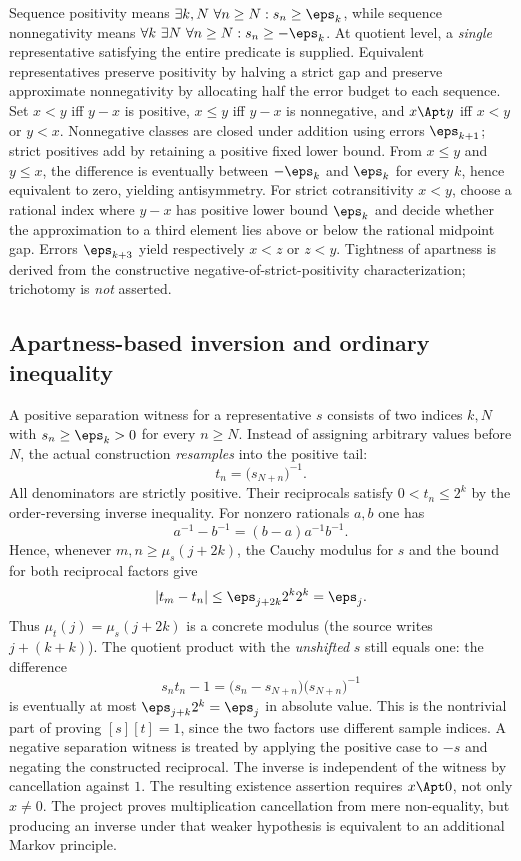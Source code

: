 Sequence positivity means $\exists k,N\ \forall n\ge N: s_n\ge\eps_k$, while sequence nonnegativity means $\forall k\ \exists N\ \forall n\ge N:s_n\ge-\eps_k$. At quotient level, a \emph{single} representative satisfying the entire predicate is supplied. Equivalent representatives preserve positivity by halving a strict gap and preserve approximate nonnegativity by allocating half the error budget to each sequence. Set $x<y$ iff $y-x$ is positive, $x\le y$ iff $y-x$ is nonnegative, and $x\Apt y$ iff $x<y$ or $y<x$. Nonnegative classes are closed under addition using errors $\eps_{k+1}$; strict positives add by retaining a positive fixed lower bound. From $x\le y$ and $y\le x$, the difference is eventually between $-\eps_k$ and $\eps_k$ for every $k$, hence equivalent to zero, yielding antisymmetry. For strict cotransitivity $x<y$, choose a rational index where $y-x$ has positive lower bound $\eps_k$ and decide whether the approximation to a third element lies above or below the rational midpoint gap. Errors $\eps_{k+3}$ yield respectively $x<z$ or $z<y$. Tightness of apartness is derived from the constructive negative-of-strict-positivity characterization; trichotomy is \emph{not} asserted.

\subsection{Apartness-based inversion and ordinary inequality}\label{supp:12-6}
\par{}\par\smallskip
\label{expanded:inverse}
A positive separation witness for a representative $s$ consists of two indices $k,N$ with $s_n\ge\eps_k>0$ for every $n\ge N$. Instead of assigning arbitrary values before $N$, the actual construction \emph{resamples} into the positive tail:
\[
 t_n=\bigl(s_{N+n}\bigr)^{-1}.
\]
All denominators are strictly positive. Their reciprocals satisfy $0<t_n\le2^k$ by the order-reversing inverse inequality. For nonzero rationals $a,b$ one has
\[
 a^{-1}-b^{-1}=(b-a)a^{-1}b^{-1}.
\]
Hence, whenever $m,n\ge\mu_s(j+2k)$, the Cauchy modulus for $s$ and the bound for both reciprocal factors give
\[
 |t_m-t_n|\le \eps_{j+2k}2^k2^k=\eps_j.
\]
Thus $\mu_t(j)=\mu_s(j+2k)$ is a concrete modulus (the source writes $j+(k+k)$). The quotient product with the \emph{unshifted} $s$ still equals one: the difference
\[
 s_nt_n-1=\bigl(s_n-s_{N+n}\bigr)\bigl(s_{N+n}\bigr)^{-1}
\]
is eventually at most $\eps_{j+k}2^k=\eps_j$ in absolute value. This is the nontrivial part of proving $[s][t]=1$, since the two factors use different sample indices. A negative separation witness is treated by applying the positive case to $-s$ and negating the constructed reciprocal. The inverse is independent of the witness by cancellation against $1$. The resulting existence assertion requires $x\Apt0$, not only $x\ne0$. The project proves multiplication cancellation from mere non-equality, but producing an inverse under that weaker hypothesis is equivalent to an additional Markov principle.

